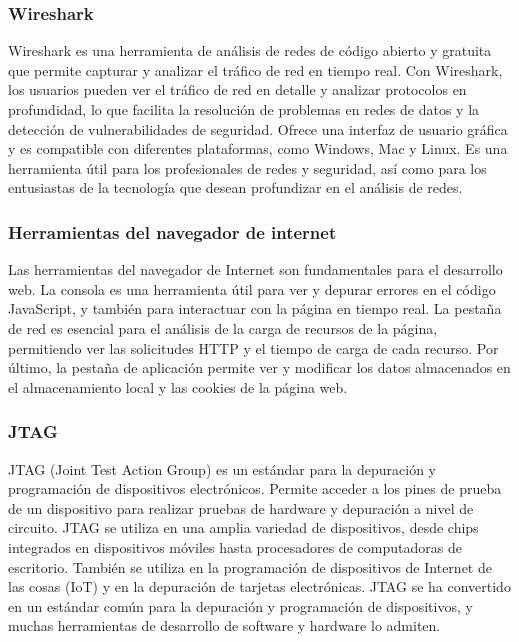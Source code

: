 \subsubsection{Wireshark}

Wireshark es una herramienta de análisis de redes de código abierto y gratuita que permite capturar y analizar el tráfico de red en tiempo real. Con Wireshark, los usuarios pueden ver el tráfico de red en detalle y analizar protocolos en profundidad, lo que facilita la resolución de problemas en redes de datos y la detección de vulnerabilidades de seguridad. Ofrece una interfaz de usuario gráfica y es compatible con diferentes plataformas, como Windows, Mac y Linux. Es una herramienta útil para los profesionales de redes y seguridad, así como para los entusiastas de la tecnología que desean profundizar en el análisis de redes.


\subsubsection{Herramientas del navegador de internet}

Las herramientas del navegador de Internet son fundamentales para el desarrollo web. La consola es una herramienta útil para ver y depurar errores en el código JavaScript, y también para interactuar con la página en tiempo real. La pestaña de red es esencial para el análisis de la carga de recursos de la página, permitiendo ver las solicitudes HTTP y el tiempo de carga de cada recurso. Por último, la pestaña de aplicación permite ver y modificar los datos almacenados en el almacenamiento local y las cookies de la página web.


\subsubsection{JTAG}

JTAG (Joint Test Action Group) es un estándar para la depuración y programación de dispositivos electrónicos. Permite acceder a los pines de prueba de un dispositivo para realizar pruebas de hardware y depuración a nivel de circuito. JTAG se utiliza en una amplia variedad de dispositivos, desde chips integrados en dispositivos móviles hasta procesadores de computadoras de escritorio. También se utiliza en la programación de dispositivos de Internet de las cosas (IoT) y en la depuración de tarjetas electrónicas. JTAG se ha convertido en un estándar común para la depuración y programación de dispositivos, y muchas herramientas de desarrollo de software y hardware lo admiten.



